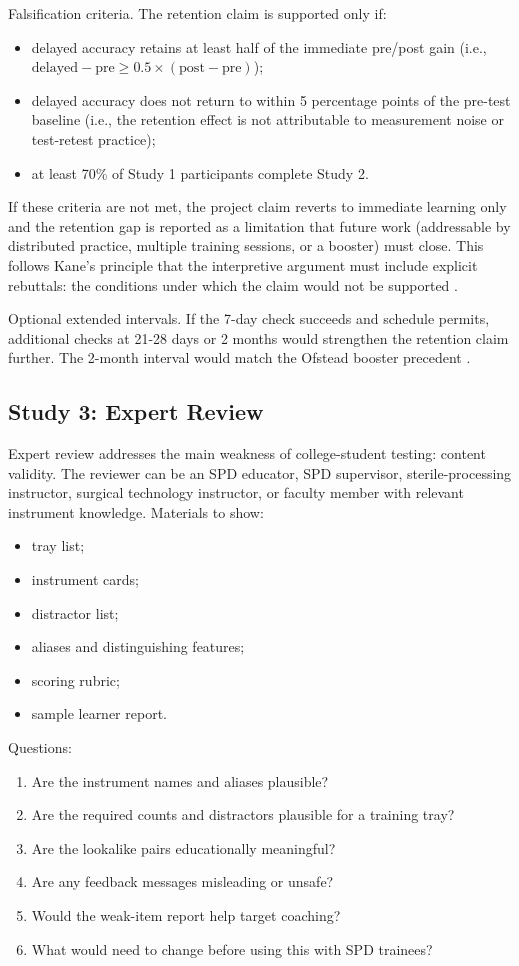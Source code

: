 \documentclass[10pt,a4paper]{article}
\begin{document}
Falsification criteria. The retention claim is supported only if:
\begin{itemize}
  \item delayed accuracy retains at least half of the immediate pre/post gain
  (i.e., $\text{delayed} - \text{pre} \ge 0.5 \times (\text{post} - \text{pre})$);
  \item delayed accuracy does not return to within 5 percentage points of the
  pre-test baseline (i.e., the retention effect is not attributable to measurement
  noise or test-retest practice);
  \item at least 70\% of Study 1 participants complete Study 2.
\end{itemize}
If these criteria are not met, the project claim reverts to immediate learning
only and the retention gap is reported as a limitation that future work
(addressable by distributed practice, multiple training sessions, or a booster)
must close. This follows Kane's principle that the interpretive argument must
include explicit rebuttals: the conditions under which the claim would not be
supported \cite{kane-validity-2013}.

Optional extended intervals. If the 7-day check succeeds and schedule permits,
additional checks at 21-28 days or 2 months would strengthen the retention claim
further. The 2-month interval would match the Ofstead booster precedent
\cite{ofstead-et-al-2023}.
\subsection{Study 3: Expert Review}


Expert review addresses the main weakness of college-student testing: content
validity. The reviewer can be an SPD educator, SPD supervisor,
sterile-processing instructor, surgical technology instructor, or faculty
member with relevant instrument knowledge.
Materials to show:
\begin{itemize}
  \item tray list;
  \item instrument cards;
  \item distractor list;
  \item aliases and distinguishing features;
  \item scoring rubric;
  \item sample learner report.
\end{itemize}
Questions:
\begin{enumerate}
  \item Are the instrument names and aliases plausible?
  \item Are the required counts and distractors plausible for a training tray?
  \item Are the lookalike pairs educationally meaningful?
  \item Are any feedback messages misleading or unsafe?
  \item Would the weak-item report help target coaching?
  \item What would need to change before using this with SPD trainees?
\end{enumerate}
\end{document}
